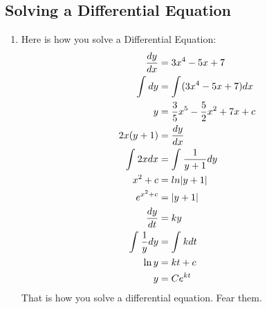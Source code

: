 \documentclass[11pt]{article}
\begin{document}
\subsection{Solving a Differential Equation}
\begin{enumerate}
	\item Here is how you solve a Differential Equation:
		\begin{align}
			\setcounter{equation}{0}
			\frac{dy}{dx} &= 3x^4 - 5x + 7 \\
			\int_{}^{}dy &= \int_{}^{}(3x^4 -5x +7)dx \\ 
			y &= \frac{3}{5}x^5 - \frac{5}{2}x^2 + 7x + c \\ 
			\setcounter{equation}{0}
			2x(y+1) &= \frac{dy}{dx} \\
			\int_{}^{}2xdx &= \int_{}^{}\frac{1}{y+1}dy \\
			x^2+c &= ln |y + 1| \\
			e^{x^2+c} &= |y+1| \\ 
			\setcounter{equation}{0}
			\frac{dy}{dt} &= ky \\
			\int_{}^{} \frac{1}{y}dy &= \int_{}^{}kdt \\
			\ln y &= kt + c \\
			y &= Ce^{kt}
		\end{align}
		That is how you solve a differential equation.
		Fear them.
\end{enumerate}
\end{document}

